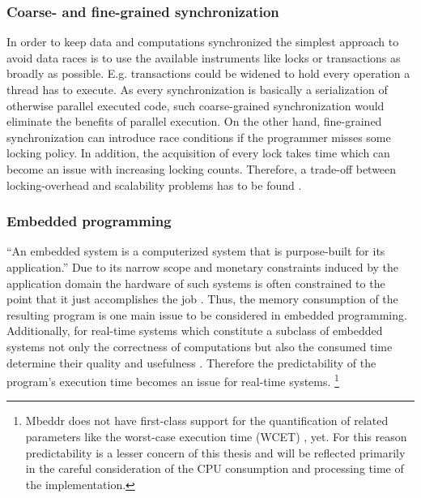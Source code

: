 \subsubsection{Coarse- and fine-grained synchronization}
In order to keep data and computations synchronized the simplest approach to avoid data races is to use the available instruments like locks or transactions as broadly as possible. E.g. transactions could be widened to hold every operation a thread has to execute. As every synchronization is basically a serialization of otherwise parallel executed code, such coarse-grained synchronization would eliminate the benefits of parallel execution. On the other hand, fine-grained synchronization can introduce race conditions if the programmer misses some locking policy. In addition, the acquisition of every lock takes time which can become an issue with increasing locking counts. Therefore, a trade-off between locking-overhead and scalability problems has to be found \cite[pp.~1-2]{PrinciplesOfTransactionalMemory}.

\subsubsection{Embedded programming}
``An embedded system is a computerized system that is purpose-built for its application.'' \cite[p.~1]{MakingEmbeddedSystems} Due to its narrow scope and monetary constraints induced by the application domain the hardware of such systems is often constrained to the point that it just accomplishes the job \cite{MakingEmbeddedSystems}. Thus, the memory consumption of the resulting program is one main issue to be considered in embedded programming. Additionally, for real-time systems which constitute a subclass of embedded systems not only the correctness of computations but also the consumed time determine their quality and usefulness \cite[pp.~1-2]{SoftReal-TimeSystems}. Therefore the predictability of the program's execution time becomes an issue for real-time systems. \footnote{Mbeddr does not have first-class support for the quantification of related parameters like the worst-case execution time (WCET) \cite[p.~8]{SoftReal-TimeSystems}, yet. For this reason predictability is a lesser concern of this thesis and will be reflected primarily in the careful consideration of the CPU consumption and processing time of the implementation.}

